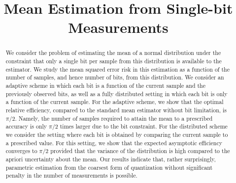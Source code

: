 \documentclass[letterpaper, conference]{IEEEtran}      %
\title{\LARGE \bf Mean Estimation from Single-bit Measurements}
\begin{document}
\graphicspath{{../Figs/}}
\maketitle
\thispagestyle{empty}
\pagestyle{empty}



\begin{abstract}
We consider the problem of estimating the mean of a normal distribution under the constraint that only a single bit per sample from this distribution is available to the estimator. We study the mean squared error risk in this estimation as a function of the number of samples, and hence number of bits, from this distribution. We consider an adaptive scheme in which each bit is a function of the current sample and the previously observed bits, as well as a fully distributed setting in which each bit is only a function of the current sample. For the adaptive scheme, we show that the optimal relative efficiency, compared to the standard mean estimator without bit limitation, is $\pi/2$. Namely, the number of samples required to attain the mean to a prescribed accuracy is only $\pi/2$ times larger due to the bit constraint. For the distributed scheme we consider the setting where each bit is obtained by comparing the current sample to a prescribed value. For this setting, we show that the expected asymptotic efficiency converges to $\pi/2$ provided that the variance of the distribution is high compared to the apriori uncertainty about the mean. Our results indicate that, rather surprisingly, parametric estimation from the coarsest form of quantization without significant penalty in the number of measurements is possible. 
\end{abstract}



\end{document}
